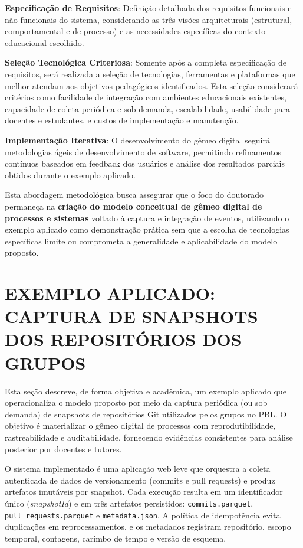 \documentclass[12pt,a4paper]{article}
\begin{document}
\textbf{Especificação de Requisitos}: Definição detalhada dos requisitos funcionais e não funcionais do sistema, considerando as três visões arquiteturais (estrutural, comportamental e de processo) e as necessidades específicas do contexto educacional escolhido.

\textbf{Seleção Tecnológica Criteriosa}: Somente após a completa especificação de requisitos, será realizada a seleção de tecnologias, ferramentas e plataformas que melhor atendam aos objetivos pedagógicos identificados. Esta seleção considerará critérios como facilidade de integração com ambientes educacionais existentes, capacidade de coleta periódica e sob demanda, escalabilidade, usabilidade para docentes e estudantes, e custos de implementação e manutenção.

\textbf{Implementação Iterativa}: O desenvolvimento do gêmeo digital seguirá metodologias ágeis de desenvolvimento de software, permitindo refinamentos contínuos baseados em feedback dos usuários e análise dos resultados parciais obtidos durante o exemplo aplicado.

Esta abordagem metodológica busca assegurar que o foco do doutorado permaneça
na \textbf{criação do modelo conceitual de gêmeo digital de processos e
  sistemas} voltado à captura e integração de eventos, utilizando o exemplo aplicado como demonstração prática sem que a escolha de tecnologias específicas limite ou
comprometa a generalidade e aplicabilidade do modelo proposto.




\section{EXEMPLO APLICADO: CAPTURA DE SNAPSHOTS DOS REPOSITÓRIOS DOS GRUPOS}

Esta seção descreve, de forma objetiva e acadêmica, um exemplo aplicado que operacionaliza o modelo proposto por meio da captura periódica (ou sob demanda) de snapshots de repositórios Git utilizados pelos grupos no PBL. O objetivo é materializar o gêmeo digital de processos com reprodutibilidade, rastreabilidade e auditabilidade, fornecendo evidências consistentes para análise posterior por docentes e tutores.

O sistema implementado é uma aplicação web leve que orquestra a coleta autenticada de dados de versionamento (commits e pull requests) e produz artefatos imutáveis por snapshot. Cada execução resulta em um identificador único (\emph{snapshotId}) e em três artefatos persistidos: \texttt{commits.parquet}, \texttt{pull\_requests.parquet} e \texttt{metadata.json}. A política de idempotência evita duplicações em reprocessamentos, e os metadados registram repositório, escopo temporal, contagens, carimbo de tempo e versão de esquema.
\end{document}
